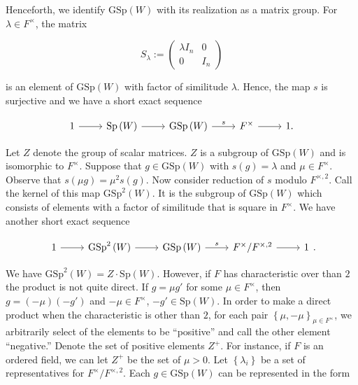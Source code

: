 \documentclass[12pt]{article}
\begin{document}
Henceforth, we identify $\text{GSp}\left(W\right)$ with its realization as a
matrix group. For $\lambda \in F^{\times}$, the matrix 


\[S_{\lambda} := \begin{pmatrix} \lambda I_{n} & 0 \\ 0 & I_{n} \end{pmatrix}\]

is an element of $\text{GSp}\left(W\right)$ with factor of similitude $\lambda$.
Hence, the map $s$ is surjective and we have a short exact sequence 

\[\begin{tikzcd}
1 \arrow[r] & \text{Sp}\left(W\right) \arrow[r] & \text{GSp}\left(W\right)
\arrow[r, "s"] & F^{\times} \arrow[r] & 1.
\end{tikzcd}\]

Let $Z$ denote the group of scalar matrices. $Z$ is a subgroup of
$\text{GSp}\left(W\right)$ and is isomorphic to $F^{\times}$. Suppose that $g
\in \text{GSp}\left(W\right)$ with $s\left(g\right) = \lambda$ and $\mu \in
F^{\times}$. Observe that $s\left(\mu g\right) = \mu^2 s\left(g\right)$. Now
consider reduction of $s$ modulo $F^{\times, 2}$. Call the kernel of this map
$\text{GSp}^2\left(W\right)$. It is the subgroup of $\text{GSp}\left(W\right)$
which consists of elements with a factor of similitude that is square in
$F^{\times}$. We have another short exact sequence


\[\begin{tikzcd}
1 \arrow[r] & \text{GSp}^2\left(W\right) \arrow[r] & \text{GSp}\left(W\right)
\arrow[r, "s"] & F^{\times}/F^{\times, 2} \arrow[r] & 1
\end{tikzcd}.\]

We have $\text{GSp}^2\left(W\right) = Z \cdot \text{Sp}\left(W\right)$. However,
if $F$ has characteristic over than $2$ the product is not quite direct. If $g =
\mu g'$ for some $\mu \in F^{\times}$, then $g = \left(- \mu\right)
\left(-g'\right)$ and $- \mu \in F^{\times}$, $-g' \in \text{Sp}\left(W\right)$.
In order to make a direct product when the characteristic is other than $2$, for
each pair $\left\{ \mu, - \mu\right\}_{\mu \in F^{\times}}$, we arbitrarily
select of the elements to be ``positive'' and call the other element
``negative.'' Denote the set of positive elements $Z^{+}$. For instance, if $F$
is an ordered field, we can let $Z^{+}$ be the set of $\mu > 0$. Let
$\left\{\lambda_{i}\right\}$ be a set of representatives for $F^{\times} /
F^{\times, 2}$. Each $g \in \text{GSp}\left(W\right)$ can be represented in the
form
\end{document}
